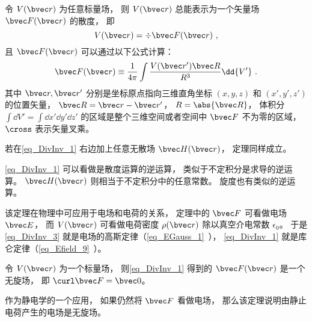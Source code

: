 

\begin{theorem}{}
令 $V(\bvec r)$ 为任意标量场， 则 $V(\bvec r)$ 总能表示为一个矢量场 $\bvec F(\bvec r)$ 的散度， 即
\begin{equation}\label{eq_DivInv_3}
V(\bvec r) = \div \bvec F(\bvec r)~,
\end{equation}
且 $\bvec F(\bvec r)$ 可以通过以下公式计算：
\begin{equation}\label{eq_DivInv_1}
\bvec F(\bvec r) \equiv \frac{1}{4\pi}\int \frac{V(\bvec r') \bvec R}{R^3} \dd{V'}~.
\end{equation}
其中 $\bvec r, \bvec r'$ 分别是坐标原点指向三维直角坐标 $(x, y, z)$ 和 $(x', y', z')$ 的位置矢量， $\bvec R = \bvec r - \bvec r'$， $R = \abs{\bvec R}$， 体积分 $\int\dd{V'} = \int\dd{x'}\dd{y'}\dd{z'}$ 的区域是整个三维空间或者空间中 $\bvec F$ 不为零的区域， $\cross$ 表示矢量叉乘。

若在\autoref{eq_DivInv_1} 右边加上任意无散场 $\bvec H(\bvec r)$， 定理同样成立。
\end{theorem}

\autoref{eq_DivInv_1} 可以看做是散度运算的逆运算， 类似于不定积分是求导的逆运算。 $\bvec H(\bvec r)$ 则相当于不定积分中的任意常数。 旋度也有类似的逆运算。

该定理在物理中可应用于电场和电荷的关系， 定理中的 $\bvec F$ 可看做电场 $\bvec E$， 而 $V(\bvec r)$ 可看做电荷密度 $\rho(\bvec r)$ 除以真空介电常数 $\epsilon_0$。 于是\autoref{eq_DivInv_3} 就是电场的高斯定律（\autoref{eq_EGauss_1}~）， \autoref{eq_DivInv_1} 就是库仑定律（\autoref{eq_Efield_9}~）。

\begin{theorem}{}\label{the_DivInv_1}
令 $V(\bvec r)$ 为一个标量场， 则\autoref{eq_DivInv_1} 得到的 $\bvec F(\bvec r)$ 是一个无旋场， 即 $\curl \bvec F = \bvec 0$。
\end{theorem}

作为静电学的一个应用， 如果仍然将 $\bvec F$ 看做电场， 那么该定理说明由静止电荷产生的电场是无旋场。

